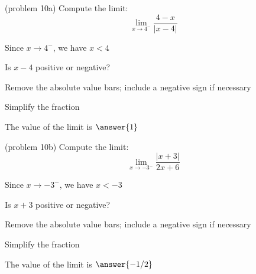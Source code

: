 \documentclass[handout]{ximera}
\begin{document}
\begin{problem}(problem 10a)
  Compute the limit:
  \[
  \lim_{x \to 4^-} \frac{4-x}{|x-4|}
  \]
  
    \begin{hint}
      Since $x \to 4^-$, we have $x<4$
    \end{hint}
    \begin{hint}
      Is $x-4$ positive or negative?
    \end{hint}
    \begin{hint}
      Remove the absolute value bars; include a negative sign if necessary
    \end{hint}
		\begin{hint}
      Simplify the fraction
    \end{hint}
		The value of the limit is
		 $\answer{1}$
		
\end{problem}


\begin{problem}(problem 10b)
  Compute the limit:
  \[
  \lim_{x \to -3^-} \frac{|x+3|}{2x+6}
  \]
  
    \begin{hint}
      Since $x \to -3^-$, we have $x<-3$
    \end{hint}
    \begin{hint}
      Is $x+3$ positive or negative?
    \end{hint}
    \begin{hint}
      Remove the absolute value bars; include a negative sign if necessary
    \end{hint}
		\begin{hint}
      Simplify the fraction
    \end{hint}
		The value of the limit is
		 $\answer{-1/2}$
		
\end{problem}


\begin{center}
\begin{foldable}
\end{foldable}
\end{center}
\end{document}
